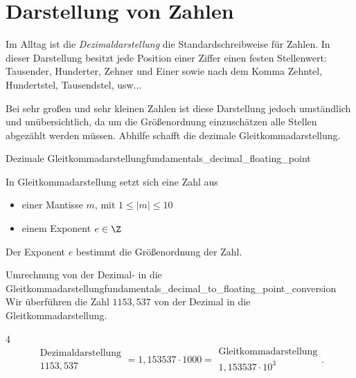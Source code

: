 \section{Darstellung von Zahlen}
\label{sec:fundamentals_number_representation}

Im Alltag ist die \emph{Dezimaldarstellung} die Standardschreibweise für
Zahlen. In dieser Darstellung besitzt jede Position einer Ziffer einen festen
Stellenwert: Tausender, Hunderter, Zehner und Einer sowie nach dem Komma Zehntel,
Hundertstel, Tausendstel, usw...

{\centering
  \par}

Bei sehr großen und sehr kleinen Zahlen ist diese Darstellung jedoch umständlich
und unübersichtlich, da um die Größenordnung einzuschätzen alle Stellen abgezählt
werden müssen. Abhilfe schafft die dezimale Gleitkommadarstellung.

\begin{DefinitionBox}{Dezimale Gleitkommadarstellung}{fundamentals_decimal_floating_point}
  \noindent
  \begin{minipage}[c]{0.67\linewidth}
    In Gleitkommadarstellung setzt sich eine Zahl aus
    \begin{itemize}
      \item einer Mantisse $m$, mit $1 \leq |m| \leq 10$
      \item einem Exponent $e\in\Z$
    \end{itemize}
  \end{minipage}\hfill
  \begin{minipage}[c]{0.3\linewidth}
    \centering
  \end{minipage}
  Der Exponent $e$ bestimmt die Größenordnung der Zahl.
\end{DefinitionBox}

\begin{ExampleBox}{Umrechnung von der Dezimal- in die Gleitkommadarstellung}{fundamentals_decimal_to_floating_point_conversion}
  Wir überführen die Zahl $1153{,}537$ von der Dezimal in die Gleitkommadarstellung.
  \begin{ClozeArea}[34]{4}
    \begingroup
    \setlength{\fboxsep}{7pt}
    \[
      \boxed{\begin{gathered}
        \text{Dezimaldarstellung}\\[0.25em]
        1153{,}537
      \end{gathered}}
      =1{,}153537\cdot1000
      =\boxed{\begin{gathered}
        \text{Gleitkommadarstellung}\\[0.25em]
        1{,}153537\cdot10^3
      \end{gathered}}.
    \]
    \endgroup
  \end{ClozeArea}
\end{ExampleBox}

